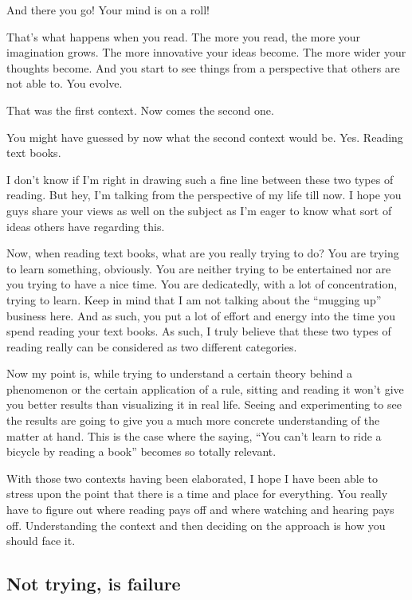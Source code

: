 \documentclass[twoside,11pt]{article}
\begin{document}
And there you go! Your mind is on a roll!

That's what happens when you read. The more you read, the more your imagination grows. The more innovative your ideas become. The more wider your thoughts become. And you start to see things from a perspective that others are not able to. You evolve.

That was the first context. Now comes the second one.

You might have guessed by now what the second context would be. Yes. Reading text books.

I don't know if I'm right in drawing such a fine line between these two types of reading. But hey, I'm talking from the perspective of my life till now. I hope you guys share your views as well on the subject as I'm eager to know what sort of ideas others have regarding this.

Now, when reading text books, what are you really trying to do? You are trying to learn something, obviously. You are neither trying to be entertained nor are you trying to have a nice time. You are dedicatedly, with a lot of concentration, trying to learn. Keep in mind that I am not talking about the ``mugging up'' business here. And as such, you put a lot of effort and energy into the time you spend reading your text books. As such, I truly believe that these two types of reading really can be considered as two different categories.

Now my point is, while trying to understand a certain theory behind a phenomenon or the certain application of a rule, sitting and reading it won't give you better results than visualizing it in real life. Seeing and experimenting to see the results are going to give you a much more concrete understanding of the matter at hand. This is the case where the saying, ``You can't learn to ride a bicycle by reading a book'' becomes so totally relevant.

With those two contexts having been elaborated, I hope I have been able to stress upon the point that there is a time and place for everything. You really have to figure out where reading pays off and where watching and hearing pays off. Understanding the context and then deciding on the approach is how you should face it.

\newpage
\begin{center}
  \section{Not trying, is failure}
\end{center}
\bigskip
\bigskip
\bigskip
\end{document}
